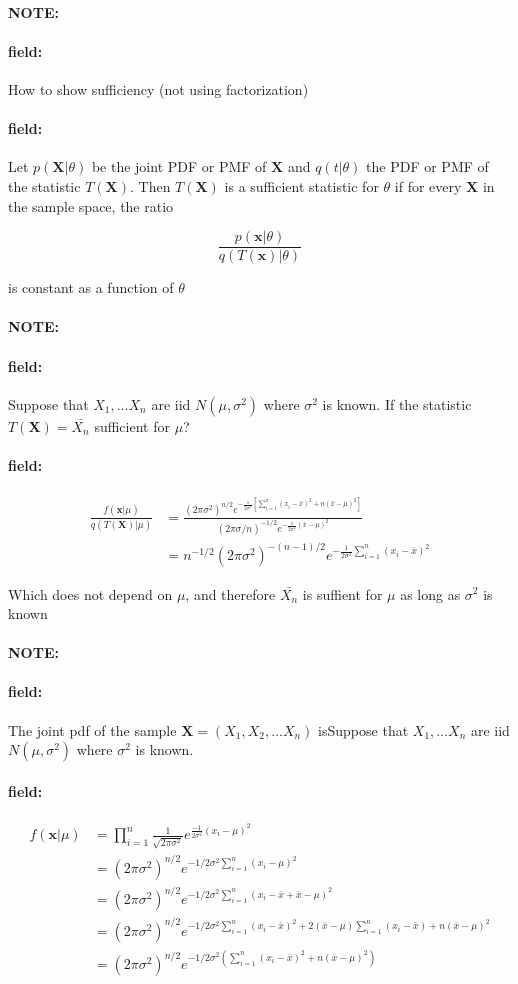 \documentclass[12pt]{article}
\newenvironment{note}{\paragraph{NOTE:}}{}
\newenvironment{field}{\paragraph{field:}}{}
\begin{document}
\begin{note}
  \begin{field}
    How to show sufficiency (not using factorization)
  \end{field}
  \begin{field}
    Let $p(\mathbf{X}|\theta)$ be the joint PDF or PMF of $\mathbf{X}$ and $q(t|\theta)$ the PDF or PMF of the statistic $T(\mathbf{X})$. Then $T(\mathbf{X})$ is a sufficient statistic for $\theta$ if for every $\mathbf{X}$ in the sample space, the ratio

    $$ \frac{p(\mathbf{x}|\theta)}{q(T(\mathbf{x})|\theta)}$$

    is constant as a function of $\theta$
  \end{field}
\end{note}

\begin{note}
  \begin{field}
    Suppose that $X_1, \ldots X_n$ are iid $N(\mu,\sigma^2)$ where $\sigma^2$ is known. If the statistic $T(\mathbf{X}) = \bar{X_n}$ sufficient for $\mu$?
  \end{field}
  \begin{field}
    \begin{align*}
       \frac{f(\mathbf{x}|\mu)}{q(T(\mathbf{X})|\mu)} &=
       \frac{(2\pi\sigma^2)^{n/2}e^{-\frac{1}{2\sigma^2}[\sum_{i = 1}^n(x_i - \bar{x})^2 + n(\bar{x} - \mu)^2]}}{(2\pi\sigma/n)^{-1/2}e^{-\frac{1}{2\sigma^2}(\bar{x}-\mu)^2}}\\
       &= n^{-1/2}(2\pi\sigma^2)^{-(n-1)/2}e^{-\frac{1}{2\sigma^2}\sum_{i = 1}^n(x_i - \bar{x})^2}
    \end{align*}

    Which does not depend on $\mu$, and therefore $\bar{X_n}$ is suffient for $\mu$ as long as $\sigma^2$ is known
  \end{field}
\end{note}

\begin{note}
  \begin{field}
    The joint pdf of the sample $\mathbf{X} =(X_1, X_2, \ldots X_n)$ isSuppose that $X_1, \ldots X_n$ are iid $N(\mu,\sigma^2)$ where $\sigma^2$ is known.
  \end{field}
  \begin{field}
    \begin{align*}
      f(\mathbf{x}|\mu) &= \prod_{i = 1}^n \frac{1}{\sqrt{2\pi\sigma^2}} e^{\frac{-1}{2\sigma^2}(x_i - \mu)^2}\\
      &= (2\pi\sigma^2)^{n/2} e^{-1/2\sigma^2 \sum_{i = 1}^n (x_i - \mu)^2}\\
      &= (2\pi\sigma^2)^{n/2} e^{-1/2\sigma^2 \sum_{i = 1}^n (x_i - \bar{x} + \bar{x} - \mu)^2}\\
      &= (2\pi\sigma^2)^{n/2} e^{-1/2\sigma^2 \sum_{i = 1}^n (x_i - \bar{x})^2 + 2(\bar{x} - \mu)\sum_{i = 1}^n (x_i - \bar{x}) + n(\bar{x} - \mu)^2}\\
      &= (2\pi\sigma^2)^{n/2}e^{-1/2\sigma^2 (\sum_{i = 1}^n (x_i - \bar{x})^2 + n(\bar{x} - \mu)^2)}
    \end{align*}
  \end{field}
\end{note}
\end{document}
